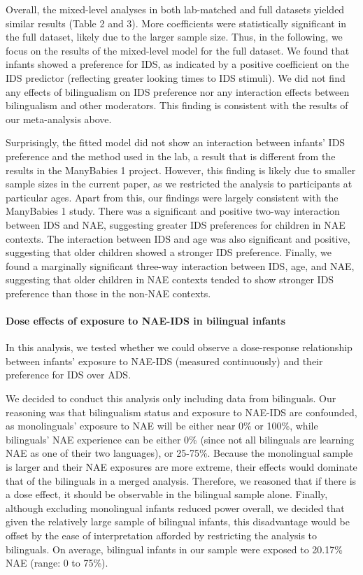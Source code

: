 \documentclass[
  english,
  ,man,floatsintext]{apa6}
\let\oldparagraph\paragraph
\renewcommand{\paragraph}[1]{\oldparagraph{#1}\mbox{}}
\begin{document}
Overall, the mixed-level analyses in both lab-matched and full datasets yielded similar results (Table 2 and 3). More coefficients were statistically significant in the full dataset, likely due to the larger sample size. Thus, in the following, we focus on the results of the mixed-level model for the full dataset. We found that infants showed a preference for IDS, as indicated by a positive coefficient on the IDS predictor (reflecting greater looking times to IDS stimuli). We did not find any effects of bilingualism on IDS preference nor any interaction effects between bilingualism and other moderators. This finding is consistent with the results of our meta-analysis above.

Surprisingly, the fitted model did not show an interaction between infants' IDS preference and the method used in the lab, a result that is different from the results in the ManyBabies 1 project. However, this finding is likely due to smaller sample sizes in the current paper, as we restricted the analysis to participants at particular ages. Apart from this, our findings were largely consistent with the ManyBabies 1 study. There was a significant and positive two-way interaction between IDS and NAE, suggesting greater IDS preferences for children in NAE contexts. The interaction between IDS and age was also significant and positive, suggesting that older children showed a stronger IDS preference. Finally, we found a marginally significant three-way interaction between IDS, age, and NAE, suggesting that older children in NAE contexts tended to show stronger IDS preference than those in the non-NAE contexts.

\hypertarget{dose-effects-of-exposure-to-nae-ids-in-bilingual-infants}{%
\paragraph{Dose effects of exposure to NAE-IDS in bilingual infants}\label{dose-effects-of-exposure-to-nae-ids-in-bilingual-infants}}

In this analysis, we tested whether we could observe a dose-response relationship between infants' exposure to NAE-IDS (measured continuously) and their preference for IDS over ADS.

We decided to conduct this analysis only including data from bilinguals. Our reasoning was that bilingualism status and exposure to NAE-IDS are confounded, as monolinguals' exposure to NAE will be either near 0\% or 100\%, while bilinguals' NAE experience can be either 0\% (since not all bilinguals are learning NAE as one of their two languages), or 25-75\%. Because the monolingual sample is larger and their NAE exposures are more extreme, their effects would dominate that of the bilinguals in a merged analysis. Therefore, we reasoned that if there is a dose effect, it should be observable in the bilingual sample alone. Finally, although excluding monolingual infants reduced power overall, we decided that given the relatively large sample of bilingual infants, this disadvantage would be offset by the ease of interpretation afforded by restricting the analysis to bilinguals. On average, bilingual infants in our sample were exposed to 20.17\% NAE (range: 0 to 75\%).
\end{document}
